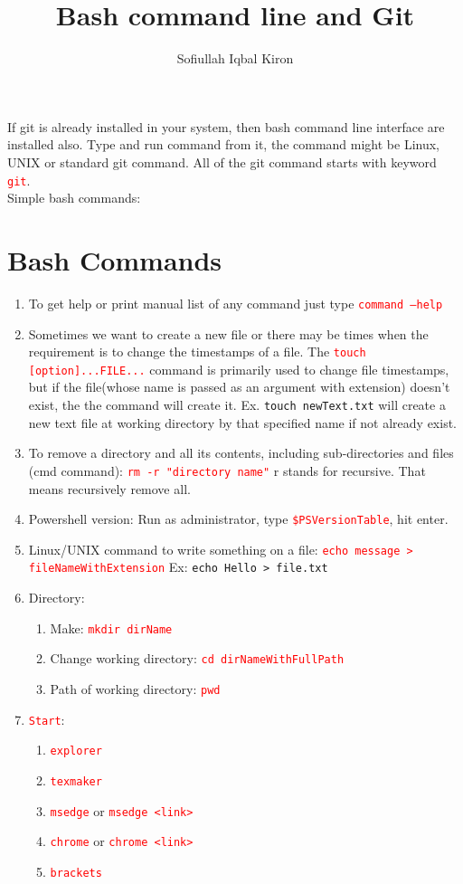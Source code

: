 \documentclass[10 pt]{article}
\title{Bash command line and Git}
\author{Sofiullah Iqbal Kiron}
\newcommand{\R}{\textcolor{red}} %
\newcommand{\T}{\texttt}
\begin{document}
\maketitle
\justify

If git is already installed in your system, then bash command line interface are installed also. Type and run command from it, the command might be Linux, UNIX or standard git command. All of the git command starts with keyword \R{\T{git}}.\\
Simple bash commands:

\section*{Bash Commands}
\begin{enumerate}
	\item To get help or print manual list of any command just type \R{\T{command --help}}
	\item Sometimes we want to create a new file or there may be times when the requirement is to change the timestamps of a file. The \R{\T{touch [option]...FILE...}} command is primarily used to change file timestamps, but if the file(whose name is passed as an argument with extension) doesn't exist, the the command will create it. Ex. \textcolor{red!70}{\texttt{touch newText.txt}} will create a new text file at working directory by that specified name if not already exist.
	\item To remove a directory and all its contents, including sub-directories and files (cmd command): \R{\T{rm -r "directory name"}} r stands for recursive. That means recursively remove all.
	\item Powershell version: Run as administrator, type \R{\T{\$PSVersionTable}}, hit enter.
	\item Linux/UNIX command to write something on a file: \R{\T{echo message > fileNameWithExtension}} Ex: \textcolor{red!70}{\texttt{echo Hello > file.txt}}
	
	\item Directory:
		\begin{enumerate}
			\item Make: \R{\T{mkdir dirName}}
			\item Change working directory: \R{\T{cd dirNameWithFullPath}}
			\item Path of working directory: \R{\T{pwd}}
		\end{enumerate}
	
	\item \R{\T{Start}}:
		\begin{enumerate}
			\item \R{\T{explorer}}
			\item \R{\T{texmaker}}
			\item \R{\T{msedge}} or \R{\T{msedge <link>}}
			\item \R{\T{chrome}} or \R{\T{chrome <link>}}
			\item \R{\T{brackets}}
			

\end{enumerate}
\end{enumerate}
\end{document}
